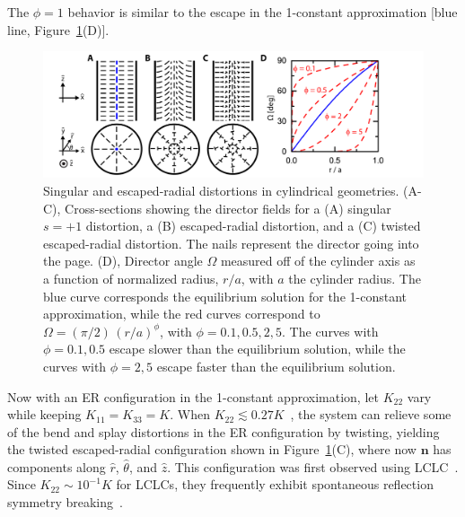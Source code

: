 The $\phi = 1$ behavior is similar to the escape in the 1-constant approximation [blue line, Figure~\ref{f:4-EscapeSchem}(D)].
\begin{figure}
  \centering
  \includegraphics{figures/C4/Ch4-Figs_EscapeSchem.png}
  \caption{Singular and escaped-radial distortions in cylindrical geometries.
  (A-C), Cross-sections showing the director fields for a (A) singular $s = +1$ distortion, a (B) escaped-radial distortion, and a (C) twisted escaped-radial distortion.
  The nails represent the director going into the page.
  (D), Director angle $\Omega$ measured off of the cylinder axis as a function of normalized radius, $r/a$, with $a$ the cylinder radius. The blue curve corresponds the equilibrium solution for the 1-constant approximation, while the red curves correspond to $\Omega = (\pi/2)\,(r/a)^{\phi}$, with $\phi = 0.1,0.5,2,5$.
  The curves with $\phi = 0.1,0.5$ escape slower than the equilibrium solution, while the curves with $\phi = 2, 5$ escape faster than the equilibrium solution.}\label{f:4-EscapeSchem}
\end{figure}

Now with an ER configuration in the 1-constant approximation, let $K_{22}$ vary while keeping $K_{11} = K_{33} = K$.
When $K_{22} \lesssim 0.27K$~\cite{RN192}, the system can relieve some of the bend and splay distortions in the ER configuration by twisting, yielding the twisted escaped-radial configuration shown in Figure~\ref{f:4-EscapeSchem}(C), where now $\mathbf{n}$ has components along $\hat{r}$, $\hat{\theta}$, and $\hat{z}$.
This configuration was first observed using LCLC~\cite{RN192}.
Since $K_{22} \sim 10^{-1}K$ for LCLCs, they frequently exhibit spontaneous reflection symmetry breaking~\cite{RN192,RN191,RN293,RN193,RN302}.


